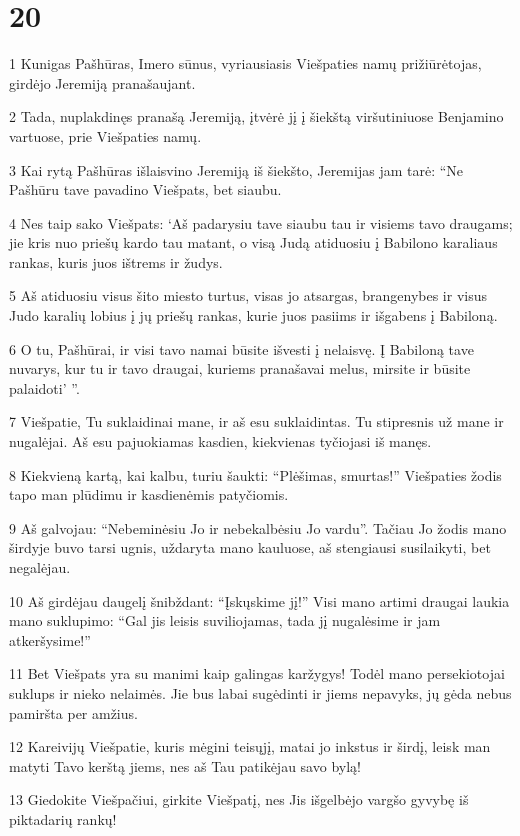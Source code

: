 \chapter{20}


\par 1 Kunigas Pašhūras, Imero sūnus, vyriausiasis Viešpaties namų prižiūrėtojas, girdėjo Jeremiją pranašaujant. 
\par 2 Tada, nuplakdinęs pranašą Jeremiją, įtvėrė jį į šiekštą viršutiniuose Benjamino vartuose, prie Viešpaties namų. 
\par 3 Kai rytą Pašhūras išlaisvino Jeremiją iš šiekšto, Jeremijas jam tarė: “Ne Pašhūru tave pavadino Viešpats, bet siaubu. 
\par 4 Nes taip sako Viešpats: ‘Aš padarysiu tave siaubu tau ir visiems tavo draugams; jie kris nuo priešų kardo tau matant, o visą Judą atiduosiu į Babilono karaliaus rankas, kuris juos ištrems ir žudys. 
\par 5 Aš atiduosiu visus šito miesto turtus, visas jo atsargas, brangenybes ir visus Judo karalių lobius į jų priešų rankas, kurie juos pasiims ir išgabens į Babiloną. 
\par 6 O tu, Pašhūrai, ir visi tavo namai būsite išvesti į nelaisvę. Į Babiloną tave nuvarys, kur tu ir tavo draugai, kuriems pranašavai melus, mirsite ir būsite palaidoti’ ”. 
\par 7 Viešpatie, Tu suklaidinai mane, ir aš esu suklaidintas. Tu stipresnis už mane ir nugalėjai. Aš esu pajuokiamas kasdien, kiekvienas tyčiojasi iš manęs. 
\par 8 Kiekvieną kartą, kai kalbu, turiu šaukti: “Plėšimas, smurtas!” Viešpaties žodis tapo man plūdimu ir kasdienėmis patyčiomis. 
\par 9 Aš galvojau: “Nebeminėsiu Jo ir nebekalbėsiu Jo vardu”. Tačiau Jo žodis mano širdyje buvo tarsi ugnis, uždaryta mano kauluose, aš stengiausi susilaikyti, bet negalėjau. 
\par 10 Aš girdėjau daugelį šnibždant: “Įskųskime jį!” Visi mano artimi draugai laukia mano suklupimo: “Gal jis leisis suviliojamas, tada jį nugalėsime ir jam atkeršysime!” 
\par 11 Bet Viešpats yra su manimi kaip galingas karžygys! Todėl mano persekiotojai suklups ir nieko nelaimės. Jie bus labai sugėdinti ir jiems nepavyks, jų gėda nebus pamiršta per amžius. 
\par 12 Kareivijų Viešpatie, kuris mėgini teisųjį, matai jo inkstus ir širdį, leisk man matyti Tavo kerštą jiems, nes aš Tau patikėjau savo bylą! 
\par 13 Giedokite Viešpačiui, girkite Viešpatį, nes Jis išgelbėjo vargšo gyvybę iš piktadarių rankų! 
